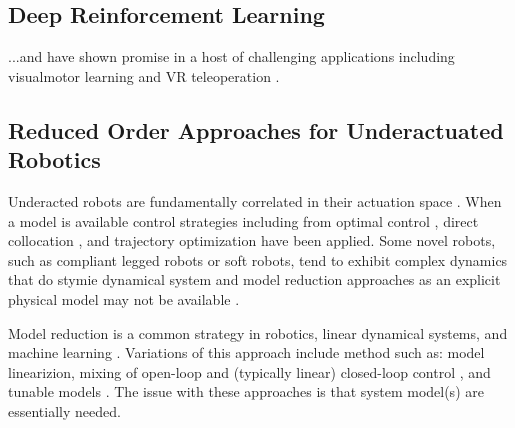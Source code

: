 \documentclass[letterpaper, 10 pt, conference]{ieeeconf}
\begin{document}
\subsection{Deep Reinforcement Learning}

...and have shown promise in a host of challenging applications including visualmotor learning \cite{finn2016deep} and VR teleoperation \cite{zhang2018deep}. 







\subsection{Reduced Order Approaches for Underactuated Robotics}

Underacted robots are fundamentally correlated in their actuation space  \cite{tedrake2009underactuated}.
When a model is available control strategies including from optimal control \cite{betts2010practical}, direct collocation \cite{von1993numerical}, and trajectory optimization \cite{kalakrishnan2011stomp} have been applied.
Some novel robots, such as compliant legged robots or soft robots, tend to exhibit complex dynamics that do stymie dynamical system and model reduction approaches as an explicit physical model may not be available \cite{nakajima2015information}.

Model reduction is a common strategy in robotics, linear dynamical systems, and machine learning \cite{betts2010practical, sutton1998reinforcement}.   Variations of this approach include method such as: model linearizion, mixing of open-loop and (typically linear) closed-loop control \cite{kolter2010probabilistic}, and tunable models \cite{maeda2011tuned}.  The issue with these approaches is that system model(s) are essentially needed.  
\end{document}
